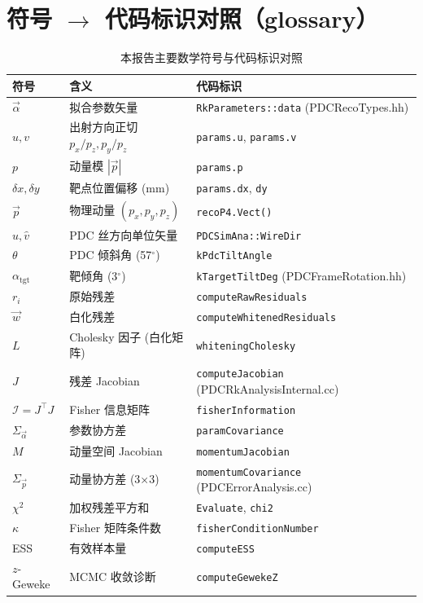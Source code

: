 \documentclass[a4paper, 11pt]{article}
\theoremstyle{plain}
\theoremstyle{definition}
\theoremstyle{remark}
\begin{document}
\section{符号 \(\to\) 代码标识对照（glossary）}
\label{app:glossary}

\begin{table}[H]
\centering\footnotesize
\caption{本报告主要数学符号与代码标识对照}
\label{tab:glossary}
\begin{tabular}{lll}
\toprule
符号 & 含义 & 代码标识 \\
\midrule
$\vec\alpha$ & 拟合参数矢量 & \texttt{RkParameters::data} (PDCRecoTypes.hh) \\
$u, v$ & 出射方向正切 $p_x/p_z, p_y/p_z$ & \texttt{params.u}, \texttt{params.v} \\
$p$ & 动量模 $|\vec p|$ & \texttt{params.p} \\
$\delta x, \delta y$ & 靶点位置偏移 (mm) & \texttt{params.dx}, \texttt{dy} \\
$\vec p$ & 物理动量 $(p_x, p_y, p_z)$ & \texttt{recoP4.Vect()} \\
$\hat u, \hat v$ & PDC 丝方向单位矢量 & \texttt{PDCSimAna::WireDir} \\
$\theta$ & PDC 倾斜角 (57$^\circ$) & \texttt{kPdcTiltAngle} \\
$\alpha_\mathrm{tgt}$ & 靶倾角 (3$^\circ$) & \texttt{kTargetTiltDeg} (PDCFrameRotation.hh) \\
$r_i$ & 原始残差 & \texttt{computeRawResiduals} \\
$\vec w$ & 白化残差 & \texttt{computeWhitenedResiduals} \\
$L$ & Cholesky 因子 (白化矩阵) & \texttt{whiteningCholesky} \\
$J$ & 残差 Jacobian & \texttt{computeJacobian} (PDCRkAnalysisInternal.cc) \\
$\mathcal I = J^\top J$ & Fisher 信息矩阵 & \texttt{fisherInformation} \\
$\Sigma_{\vec\alpha}$ & 参数协方差 & \texttt{paramCovariance} \\
$M$ & 动量空间 Jacobian & \texttt{momentumJacobian} \\
$\Sigma_{\vec p}$ & 动量协方差 (3$\times$3) & \texttt{momentumCovariance} (PDCErrorAnalysis.cc) \\
$\chi^2$ & 加权残差平方和 & \texttt{Evaluate}, \texttt{chi2} \\
$\kappa$ & Fisher 矩阵条件数 & \texttt{fisherConditionNumber} \\
ESS & 有效样本量 & \texttt{computeESS} \\
$z$-Geweke & MCMC 收敛诊断 & \texttt{computeGewekeZ} \\
\bottomrule
\end{tabular}
\end{table}
\end{document}

